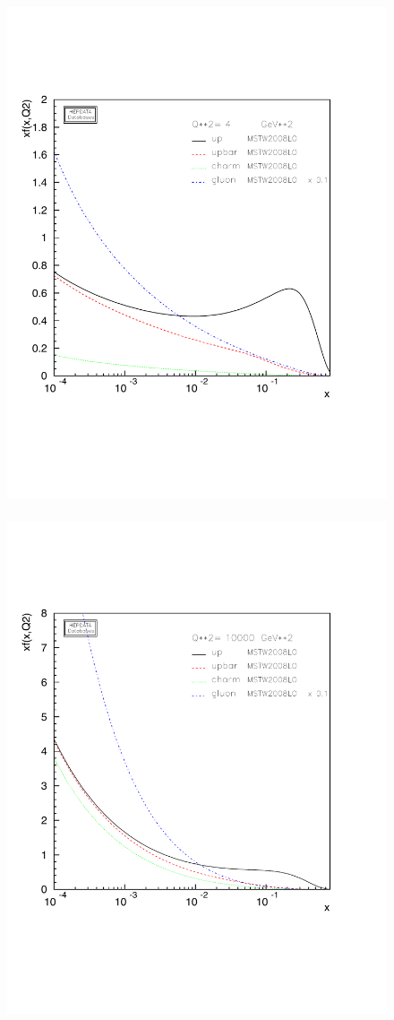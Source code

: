 \begin{figure}[t]
\centering
\includegraphics[scale=0.42]{pdfs2gev} \ 
\includegraphics[scale=0.42]{pdfs100gev}

\end{figure}
